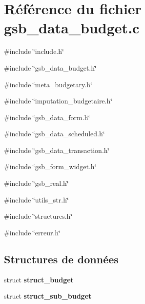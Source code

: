 \section{Référence du fichier gsb\_\-data\_\-budget.c}
\label{gsb__data__budget_8c}
{\ttfamily \#include \char`\"{}include.h\char`\"{}}\par
{\ttfamily \#include \char`\"{}gsb\_\-data\_\-budget.h\char`\"{}}\par
{\ttfamily \#include \char`\"{}meta\_\-budgetary.h\char`\"{}}\par
{\ttfamily \#include \char`\"{}imputation\_\-budgetaire.h\char`\"{}}\par
{\ttfamily \#include \char`\"{}gsb\_\-data\_\-form.h\char`\"{}}\par
{\ttfamily \#include \char`\"{}gsb\_\-data\_\-scheduled.h\char`\"{}}\par
{\ttfamily \#include \char`\"{}gsb\_\-data\_\-transaction.h\char`\"{}}\par
{\ttfamily \#include \char`\"{}gsb\_\-form\_\-widget.h\char`\"{}}\par
{\ttfamily \#include \char`\"{}gsb\_\-real.h\char`\"{}}\par
{\ttfamily \#include \char`\"{}utils\_\-str.h\char`\"{}}\par
{\ttfamily \#include \char`\"{}structures.h\char`\"{}}\par
{\ttfamily \#include \char`\"{}erreur.h\char`\"{}}\par
\subsection*{Structures de données}
\begin{DoxyCompactItemize}
\item 
struct {\bf struct\_\-budget}
\item 
struct {\bf struct\_\-sub\_\-budget}
\end{DoxyCompactItemize}
